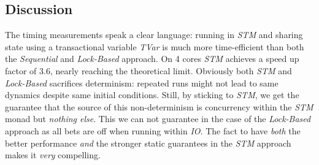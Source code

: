 \subsection{Discussion}
The timing measurements speak a clear language: running in \textit{STM} and sharing state using a transactional variable \textit{TVar} is much more time-efficient than both the \textit{Sequential} and \textit{Lock-Based} approach. On 4 cores \textit{STM} achieves a speed up factor of 3.6, nearly reaching the theoretical limit.
Obviously both \textit{STM} and \textit{Lock-Based} sacrifices determinism: repeated runs might not lead to same dynamics despite same initial conditions. Still, by sticking to \textit{STM}, we get the guarantee that the source of this non-determinism is concurrency within the \textit{STM} monad but \textit{nothing else}. This we can not guarantee in the case of the \textit{Lock-Based} approach as all bets are off when running within \textit{IO}. The fact to have \textit{both} the better performance \textit{and} the stronger static guarantees in the \textit{STM} approach makes it \textit{very} compelling.